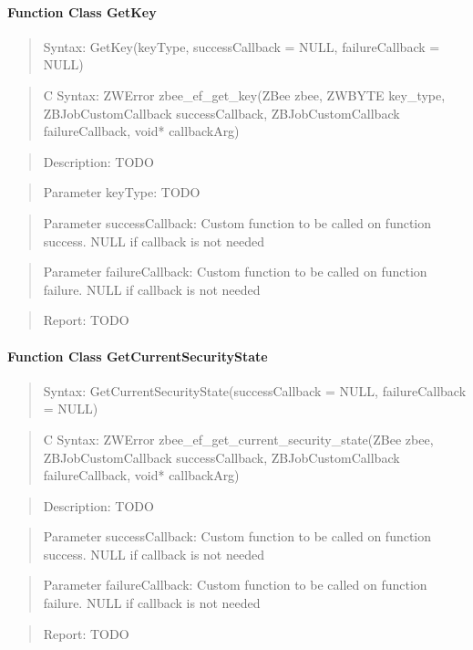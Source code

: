 \paragraph{Function Class GetKey}
\begin{quote}Syntax: GetKey(keyType, successCallback = NULL, failureCallback = NULL)\end{quote}
\begin{quote}C Syntax: ZWError zbee\_ef\_get\_key(ZBee zbee, ZWBYTE key\_type, ZBJobCustomCallback successCallback, ZBJobCustomCallback failureCallback, void* callbackArg)\end{quote}
\begin{quote}Description: TODO\end{quote}
\begin{quote}Parameter keyType: TODO\end{quote}
\begin{quote}Parameter successCallback: Custom function to be called on function success. NULL if callback is not needed\end{quote}
\begin{quote}Parameter failureCallback: Custom function to be called on function failure. NULL if callback is not needed\end{quote}
\begin{quote}Report: TODO\end{quote}

\paragraph{Function Class GetCurrentSecurityState}
\begin{quote}Syntax: GetCurrentSecurityState(successCallback = NULL, failureCallback = NULL)\end{quote}
\begin{quote}C Syntax: ZWError zbee\_ef\_get\_current\_security\_state(ZBee zbee, ZBJobCustomCallback successCallback, ZBJobCustomCallback failureCallback, void* callbackArg)\end{quote}
\begin{quote}Description: TODO\end{quote}
\begin{quote}Parameter successCallback: Custom function to be called on function success. NULL if callback is not needed\end{quote}
\begin{quote}Parameter failureCallback: Custom function to be called on function failure. NULL if callback is not needed\end{quote}
\begin{quote}Report: TODO\end{quote}

